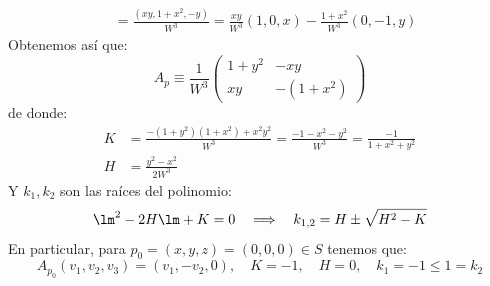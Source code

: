 \begin{ejercicio}
\begin{align*}
                    &= \frac{(xy,1+x^2,-y)}{W^3} = \frac{xy}{W^3}(1,0,x) - \frac{1+x^2}{W^3}(0,-1,y)
    \end{align*}
    Obtenemos así que:
    \begin{equation*}
        A_p \equiv \frac{1}{W^3} \left(\begin{array}{cc}
            1+y^2 & -xy \\
             xy &  -(1+x^2)
        \end{array}\right)
    \end{equation*}
    de donde:
    \begin{align*}
        K &= \frac{-(1+y^2)(1+x^2)+x^2y^2}{W^3} = \frac{-1-x^2-y^2}{W^3} = \frac{-1}{1+x^2+y^2} \\
        H &= \frac{y^2-x^2}{2W^3}
    \end{align*}
    Y $k_1,k_2$ son las raíces del polinomio:
    \begin{equation*}
        \lm^2 - 2H\lm + K = 0 \quad\Longrightarrow\quad k_{1,2} = H\pm \sqrt{H^2-K}
    \end{equation*}
    En particular, para $p_0=(x,y,z)=(0,0,0)\in S$ tenemos que:
    \begin{equation*}
        A_{p_0}(v_1,v_2,v_3) = (v_1,-v_2,0), \quad K = -1, \quad H = 0, \quad k_1 = -1\leq 1 = k_2
    \end{equation*}
\end{ejercicio}~\\

